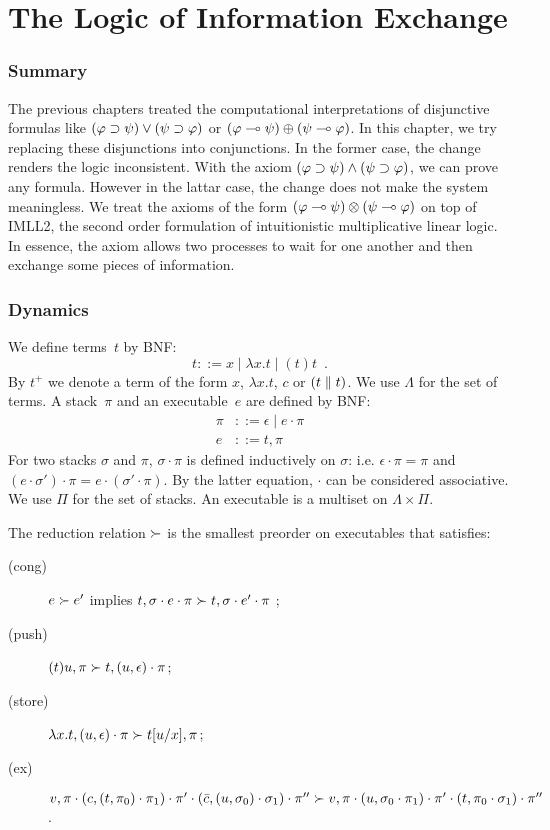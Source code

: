 \chapter{The Logic of Information Exchange}
\label{ch:exchange}

\subsection{Summary}

The previous chapters treated the computational interpretations of
disjunctive formulas like $(\varphi\supset\psi)\lor(\psi\supset\varphi)$ or
$(\varphi\multimap\psi)\oplus(\psi\multimap\varphi)$.  In this chapter, we try
replacing these disjunctions into conjunctions.
In the former case, the change renders the logic inconsistent.
With the axiom $(\varphi\supset\psi)\land(\psi\supset\varphi)$,
we can prove any formula.  However in the lattar case, the change does
not make the system meaningless.  We treat
the axioms of the form $(\varphi\multimap\psi)\otimes(\psi\multimap\varphi)$
on top of IMLL2, the second order formulation of intuitionistic
multiplicative linear
logic.  In essence, the axiom allows two processes to wait for one
another and then exchange some pieces of information.

\subsection{Dynamics}

We define terms~$t$ by BNF:
\[
 t ::= x\mid \lambda x.t\mid (t)t\enspace.
\]
By $t^+$ we denote a term of the form $x$, $\lambda x.t$, $c$ or $(t\parallel
t)$.
We use $\Lambda$ for the set of terms.
A stack~$\pi$ and an executable~$e$
are defined by BNF:
\begin{align*}
 \pi &::= \epsilon\mid e\cdot\pi\\
 e   &::= t,\pi
\end{align*}
For two stacks $\sigma$ and $\pi$, $\sigma\cdot\pi$ is defined
inductively on $\sigma$: i.e. $\epsilon\cdot\pi = \pi$ and $(e
\cdot \sigma') \cdot \pi = e\cdot (\sigma'\cdot \pi)$.  By the latter
equation, $\cdot$ can be considered associative.
We use $\Pi$ for the set of stacks.
An executable is a multiset on $\Lambda\times \Pi$.

The reduction relation $\succ$ is the smallest preorder on executables
that satisfies:
\begin{description}
 \item[(cong)] $e\succ e'$ implies $t, \sigma \cdot e \cdot \pi\succ
      t,\sigma\cdot e'\cdot \pi$ \enspace;
 \item[(push)]
	    $(t)u, \pi   \succ t,(u,\epsilon)\cdot\pi$\enspace;
 \item[(store)]
	    $\lambda x.t,(u,\epsilon)\cdot\pi
	     \succ
	     t[u/x], \pi$\enspace;
 \item[(ex)]
           $v, \pi\cdot (c, (t,\pi_0)\cdot \pi_1)\cdot\pi' \cdot (\bar{c},(u,\sigma_0)\cdot \sigma_1) \cdot \pi''\succ
      v, \pi\cdot (u, \sigma_0\cdot \pi_1)\cdot\pi' \cdot (
      t,\pi_0\cdot \sigma_1) \cdot \pi''
      $
      \enspace.
\end{description}


